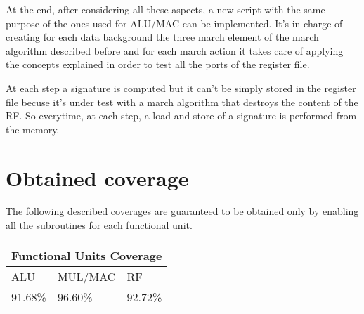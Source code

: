 \documentclass[paper=a4, fontsize=10pt]{scrartcl}	%
\begin{document}
	At the end, after considering all these aspects, a new script with the same purpose of the ones used for ALU/MAC can be implemented. It's in charge of creating for each data background the three march element of the march algorithm described before and for each march action it takes care of applying the concepts explained in order to test all the ports of the register file. \newline

	At each step a signature is computed but it can't be simply stored in the register file becuse it's under test with a march algorithm that destroys the content of the RF. So everytime, at each step, a load and store of a signature is performed from the memory.

	\section{Obtained coverage}

	The following described coverages are guaranteed to be obtained only by enabling all the subroutines for each functional unit.

	\begin{center}
		\begin{tabular}{ |p{3cm}|p{3cm}|p{3cm}|  }
			\hline
			\multicolumn{3}{|c|}{Functional Units Coverage} \\
			\hline
			ALU&MUL/MAC&RF\\
			\hline
			91.68\%&96.60\%&92.72\%\\
			\hline
		\end{tabular}
	\end{center}
\end{document}
